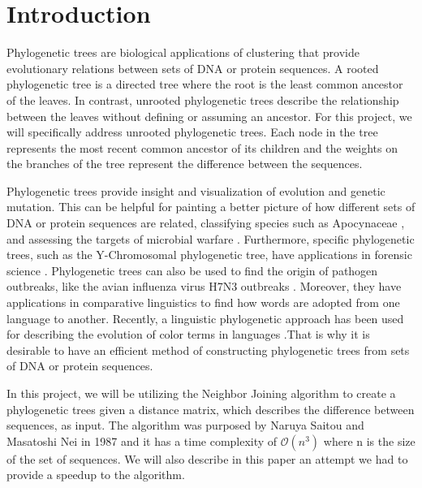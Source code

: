 \section{Introduction}

Phylogenetic trees are biological applications of clustering that provide evolutionary relations between sets of DNA or protein sequences. A rooted phylogenetic tree is a directed tree where the root is the least common ancestor of the leaves. In contrast, unrooted phylogenetic trees describe the relationship between the leaves without defining or assuming an ancestor. For this project, we will specifically address unrooted phylogenetic trees. Each node in the tree represents the most recent common ancestor of its children and the weights on the branches of the tree represent the difference between the sequences.

Phylogenetic trees provide insight and visualization of evolution and genetic mutation. This can be helpful for painting a better picture of how different sets of DNA or protein sequences are related, classifying species such as Apocynaceae \cite{saitou1987neighbor}, and assessing the targets of microbial warfare \cite{riley2003}. Furthermore, specific phylogenetic trees, such as the Y-Chromosomal phylogenetic tree, have applications in forensic science \cite{van2013}. Phylogenetic trees can also be used to find the origin of pathogen outbreaks, like the avian influenza virus H7N3 outbreaks \cite{lu2014}. Moreover, they have applications in comparative linguistics to find how words are adopted from one language to another. Recently, a linguistic phylogenetic approach has been used for describing the evolution of color terms in languages \cite{haynie2016}.That is why it is desirable to have an efficient method of constructing phylogenetic trees from sets of DNA or protein sequences.

In this project, we will be utilizing the Neighbor Joining algorithm to create a phylogenetic trees given a distance matrix, which describes the difference between sequences, as input. The algorithm was purposed by Naruya Saitou and Masatoshi Nei in 1987 \cite{saitou1987neighbor} and it has a time complexity of $\mathcal{O}(n^3)$ where n is the size of the set of sequences. We will also describe in this paper an attempt we had to provide a speedup to the algorithm.
